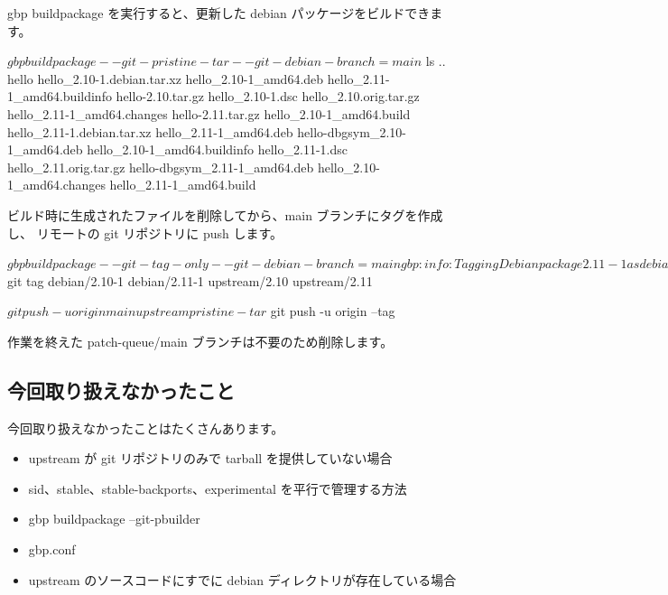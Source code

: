 \documentclass[mingoth,a4paper]{jsarticle}
\begin{document}
gbp buildpackage を実行すると、更新した debian パッケージをビルドできます。

\begin{commandline}
$ gbp buildpackage --git-pristine-tar --git-debian-branch=main

$ ls ..
hello                          hello_2.10-1.debian.tar.xz    hello_2.10-1_amd64.deb      hello_2.11-1_amd64.buildinfo
hello-2.10.tar.gz              hello_2.10-1.dsc              hello_2.10.orig.tar.gz      hello_2.11-1_amd64.changes
hello-2.11.tar.gz              hello_2.10-1_amd64.build      hello_2.11-1.debian.tar.xz  hello_2.11-1_amd64.deb
hello-dbgsym_2.10-1_amd64.deb  hello_2.10-1_amd64.buildinfo  hello_2.11-1.dsc            hello_2.11.orig.tar.gz
hello-dbgsym_2.11-1_amd64.deb  hello_2.10-1_amd64.changes    hello_2.11-1_amd64.build
\end{commandline}

ビルド時に生成されたファイルを削除してから、main ブランチにタグを作成し、
リモートの git リポジトリに push します。

\begin{commandline}
$ gbp buildpackage --git-tag-only --git-debian-branch=main
gbp:info: Tagging Debian package 2.11-1 as debian/2.11-1 in git

$ git tag
debian/2.10-1
debian/2.11-1
upstream/2.10
upstream/2.11
\end{commandline}

\begin{commandline}
$ git push -u origin main upstream pristine-tar
$ git push -u origin --tag
\end{commandline}

作業を終えた patch-queue/main ブランチは不要のため削除します。



\subsection{今回取り扱えなかったこと}

今回取り扱えなかったことはたくさんあります。

\begin{itemize}
  \item upstream が git リポジトリのみで tarball を提供していない場合
  \item sid、stable、stable-backports、experimental を平行で管理する方法
  \item gbp buildpackage --git-pbuilder
  \item gbp.conf
  \item upstream のソースコードにすでに debian ディレクトリが存在している場合
\end{itemize}
\end{document}
